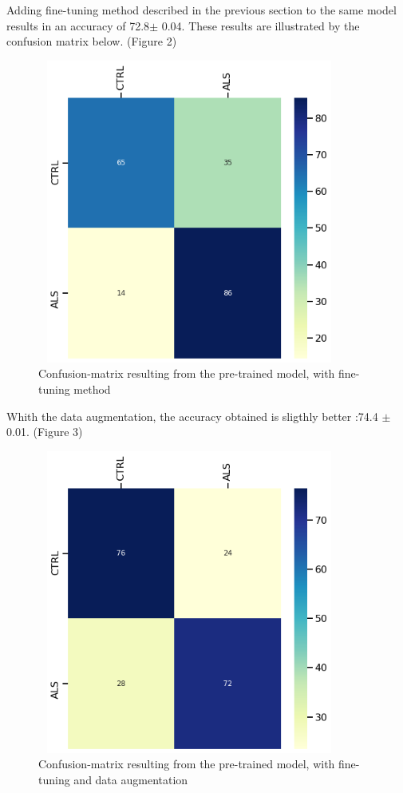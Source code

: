 Adding fine-tuning method described in the previous section to the same model results in an accuracy of 72.8$\pm$ 0.04. These results are illustrated by the confusion matrix below. (Figure 2)
\begin{figure}[H]
\centering
\caption{Confusion-matrix resulting from the pre-trained model, with fine-tuning method}
\includegraphics[width=10cm, height=10cm]{finetuning_model_results}
\end{figure}

Whith the data augmentation, the accuracy obtained is sligthly better :74.4 $\pm$ 0.01. (Figure 3)
\begin{figure}[H]
\centering
\caption{Confusion-matrix resulting from the pre-trained model, with fine-tuning and data augmentation}
\includegraphics[width=10cm, height=10cm]{finetuning_data_augmentation_model_results}
\end{figure}

